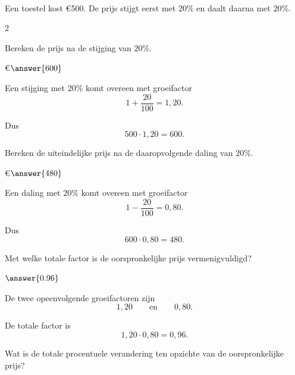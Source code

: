 \documentclass{ximera}
\begin{document}
    \begin{oefening}{\oefU\ESS}
    \\
    
    Een toestel kost €500. De prijs stijgt eerst met $20\%$ en daalt daarna met $20\%$.
    
    \begin{multicols}{2}
    
    \begin{question}
    Bereken de prijs na de stijging van $20\%$.
    
    €$\answer{600}$
    
    \begin{oplossing}
    Een stijging met $20\%$ komt overeen met groeifactor
    \[
    1+\dfrac{20}{100}=1{,}20.
    \]
    
    Dus
    \[
    500\cdot1{,}20
    =600.
    \]
    \end{oplossing}
    \end{question}
    
    
    \begin{question}
    Bereken de uiteindelijke prijs na de daaropvolgende daling van $20\%$.
    
    €$\answer{480}$
    
    \begin{oplossing}
    Een daling met $20\%$ komt overeen met groeifactor
    \[
    1-\dfrac{20}{100}=0{,}80.
    \]
    
    Dus
    \[
    600\cdot0{,}80
    =480.
    \]
    \end{oplossing}
    \end{question}
    
    
    \begin{question}
    Met welke totale factor is de oorspronkelijke prijs vermenigvuldigd?
    
    $\answer{0.96}$
    
    \begin{oplossing}
    De twee opeenvolgende groeifactoren zijn
    \[
    1{,}20
    \qquad\text{en}\qquad
    0{,}80.
    \]
    
    De totale factor is
    \[
    1{,}20\cdot0{,}80
    =0{,}96.
    \]
    \end{oplossing}
    \end{question}
    
    
    \begin{question}
    Wat is de totale procentuele verandering ten opzichte van de oorspronkelijke prijs?
    

\end{question}
\end{multicols}
\end{oefening}
\end{document}
